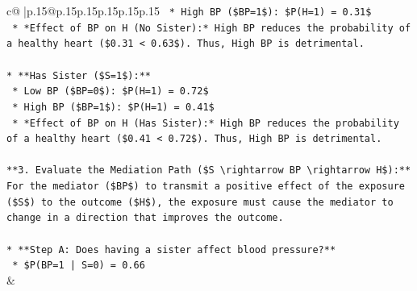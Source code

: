 \documentclass{article}
\begin{document}
{\begin{supertabular}{c@{$\;$}|p{.15\linewidth}@{}p{.15\linewidth}p{.15\linewidth}p{.15\linewidth}p{.15\linewidth}p{.15\linewidth}}
{{{\texttt{    *   High BP (\$BP=1\$): \$P(H=1) = 0.31\$} \\
\texttt{    *   *Effect of BP on H (No Sister):* High BP reduces the probability of a healthy heart (\$0.31 < 0.63\$). Thus, High BP is detrimental.} \\
\\ 
\texttt{*   **Has Sister (\$S=1\$):**} \\
\texttt{    *   Low BP (\$BP=0\$): \$P(H=1) = 0.72\$} \\
\texttt{    *   High BP (\$BP=1\$): \$P(H=1) = 0.41\$} \\
\texttt{    *   *Effect of BP on H (Has Sister):* High BP reduces the probability of a healthy heart (\$0.41 < 0.72\$). Thus, High BP is detrimental.} \\
\\ 
\texttt{**3. Evaluate the Mediation Path (\$S \textbackslash{}rightarrow BP \textbackslash{}rightarrow H\$):**} \\
\texttt{For the mediator (\$BP\$) to transmit a positive effect of the exposure (\$S\$) to the outcome (\$H\$), the exposure must cause the mediator to change in a direction that improves the outcome.} \\
\\ 
\texttt{*   **Step A: Does having a sister affect blood pressure?**} \\
\texttt{    *   \$P(BP=1 | S=0) = 0.66} \\
            }
        }
    }
    & \\ \\


\end{supertabular}}
\end{document}
